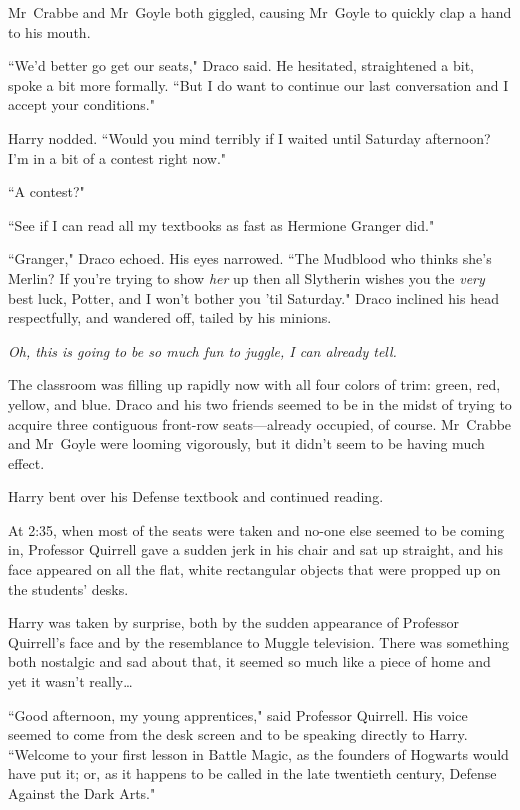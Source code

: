 Mr~Crabbe and Mr~Goyle both giggled, causing Mr~Goyle to quickly clap a hand to his mouth.

``We'd better go get our seats," Draco said. He hesitated, straightened a bit, spoke a bit more formally. ``But I do want to continue our last conversation and I accept your conditions."

Harry nodded. ``Would you mind terribly if I waited until Saturday afternoon? I'm in a bit of a contest right now."

``A contest?"

``See if I can read all my textbooks as fast as Hermione Granger did."

``Granger," Draco echoed. His eyes narrowed. ``The Mudblood who thinks she's Merlin? If you're trying to show \emph{her} up then all Slytherin wishes you the \emph{very} best luck, Potter, and I won't bother you 'til Saturday." Draco inclined his head respectfully, and wandered off, tailed by his minions.

\emph{Oh, this is going to be \emph{so} much fun to juggle, I can already tell.}

The classroom was filling up rapidly now with all four colors of trim: green, red, yellow, and blue. Draco and his two friends seemed to be in the midst of trying to acquire three contiguous front-row seats—already occupied, of course. Mr~Crabbe and Mr~Goyle were looming vigorously, but it didn't seem to be having much effect.

Harry bent over his Defense textbook and continued reading.

\later

At 2:35\pm, when most of the seats were taken and no-one else seemed to be coming in, Professor Quirrell gave a sudden jerk in his chair and sat up straight, and his face appeared on all the flat, white rectangular objects that were propped up on the students' desks.

Harry was taken by surprise, both by the sudden appearance of Professor Quirrell's face and by the resemblance to Muggle television. There was something both nostalgic and sad about that, it seemed so much like a piece of home and yet it wasn't really{\ldots}

``Good afternoon, my young apprentices," said Professor Quirrell. His voice seemed to come from the desk screen and to be speaking directly to Harry. ``Welcome to your first lesson in Battle Magic, as the founders of Hogwarts would have put it; or, as it happens to be called in the late twentieth century, Defense Against the Dark Arts."

